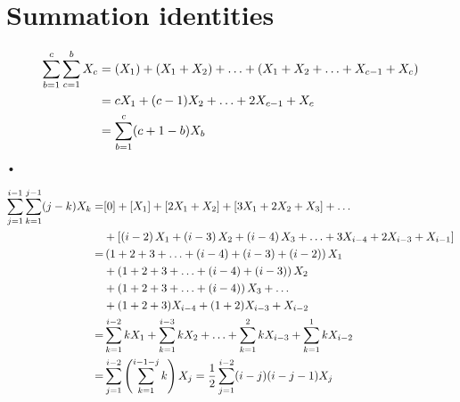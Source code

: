 \section{Summation identities}\label{sec: summation identities}
\begin{align}
\sum_{b=1}^{c}\sum_{c=1}^{b} X_{c} & = \left( X_{1}\right) 
 + \left( X_{1} + X_{2} \right) + \ldots  +\left( X_{1} + X_{2} 
 + \ldots + X_{c-1} + X_{c}\right)\\
& = c X_{1} + (c-1)X_{2} + \ldots + 2 X_{c-1} + X_{c} \\
& = \sum_{b=1}^{c}(c+1-b)X_{b}
\end{align}•

\begin{align}
\sum_{j=1}^{i-1}\sum_{k=1}^{j-1}(j-k)X_{k} = & [0] + \left[ X_{1}\right] 
+ \left[2X_{1} + X_{2} \right] + \left[3X_{1} + 2X_{2} +X_{3}\right] 
+ \ldots  \\
& + \left[\left(i-2\right)X_{1} + \left(i-3\right)X_{2} 
+ \left(i-4\right)X_{3} + \ldots + 3X_{i-4} + 2X_{i-3} + X_{i-1}\right]  \\
= & \left(1 + 2 + 3 + \ldots +  (i-4) + (i-3) + (i-2)\right)X_{1}   \\ 
& + \left(1 + 2 + 3 + \ldots +(i-4) + (i-3) \right)X_{2}   \\ 
& + \left(1 + 2 + 3 + \ldots + (i-4) \right)X_{3} + \ldots   \\ 
& + (1 + 2 + 3)X_{i-4} + (1+2)X_{i-3} + X_{i-2}  \\
= & \sum_{k=1}^{i-2}k X_{1} + \sum_{k=1}^{i-3}k X_{2}  + \ldots + \sum_{k=1}^{2}k X_{i-3} 
+ \sum_{k=1}^{1}kX_{i-2}  \\
= & \sum_{j=1}^{i-2}\left(\sum_{k=1}^{i-1-j}k\right)X_{j} = 
\frac{1}{2}\sum_{j=1}^{i-2}(i-j)(i-j-1)X_{j}
\end{align}
